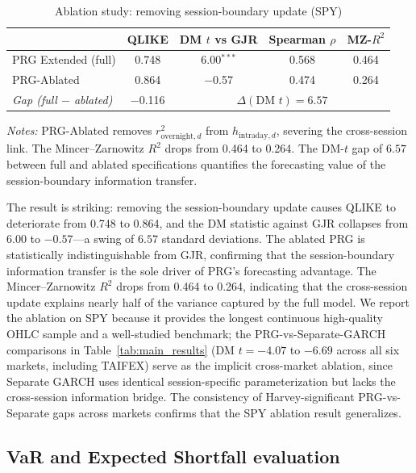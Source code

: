 \documentclass[11pt,a4paper]{article}
\begin{document}
\begin{table}[htbp]
\centering
\caption{Ablation study: removing session-boundary update (SPY)}
\label{tab:ablation}
\small
\begin{tabular}{lcccc}
\toprule
 & QLIKE & DM $t$ vs GJR & Spearman $\rho$ & MZ-$R^2$ \\
\midrule
PRG Extended (full)    & 0.748 & 6.00$^{***}$ & 0.568 & 0.464 \\
PRG-Ablated            & 0.864 & $-$0.57      & 0.474 & 0.264 \\[2pt]
\emph{Gap (full $-$ ablated)} & $-$0.116 & \multicolumn{3}{c}{$\Delta(\text{DM } t) = 6.57$} \\
\bottomrule
\end{tabular}
\begin{flushleft}
\footnotesize
\emph{Notes:} PRG-Ablated removes $r^2_{\text{overnight},d}$ from $h_{\text{intraday},d}$, severing the cross-session link. The Mincer--Zarnowitz $R^2$ drops from 0.464 to 0.264. The DM-$t$ gap of $6.57$ between full and ablated specifications quantifies the forecasting value of the session-boundary information transfer.
\end{flushleft}
\end{table}

The result is striking: removing the session-boundary update causes QLIKE to deteriorate from 0.748 to 0.864, and the DM statistic against GJR collapses from $6.00$ to $-0.57$---a swing of $6.57$ standard deviations. The ablated PRG is statistically indistinguishable from GJR, confirming that the session-boundary information transfer is the sole driver of PRG's forecasting advantage. The Mincer--Zarnowitz $R^2$ drops from 0.464 to 0.264, indicating that the cross-session update explains nearly half of the variance captured by the full model. We report the ablation on SPY because it provides the longest continuous high-quality OHLC sample and a well-studied benchmark; the PRG-vs-Separate-GARCH comparisons in Table~\ref{tab:main_results} (DM $t = -4.07$ to $-6.69$ across all six markets, including TAIFEX) serve as the implicit cross-market ablation, since Separate GARCH uses identical session-specific parameterization but lacks the cross-session information bridge. The consistency of Harvey-significant PRG-vs-Separate gaps across markets confirms that the SPY ablation result generalizes.

\subsection{VaR and Expected Shortfall evaluation}
\end{document}

